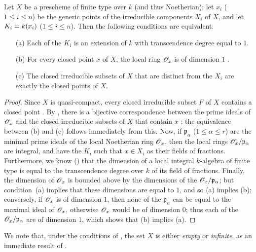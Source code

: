 \begin{proposition}[7.4.1]
\label{II.7.4.1}
Let $X$ be a prescheme of finite type over $k$ (and thus Noetherian);
let $x_i$ ($1\leq i\leq n$) be the generic points of the irreducible components $X_i$ of $X$, and let $K_i=k(x_i)$ ($1\leq i\leq n$).
Then the following conditions are equivalent:
\begin{enumerate}
    \item[\rm{(a)}] Each of the $K_i$ is an extension of $k$ with transcendence degree equal to $1$.
    \item[\rm{(b)}] For every closed point $x$ of $X$, the local ring $\mathscr{O}_x$ is of dimension $1$ .
    \item[\rm{(c)}] The closed irreducible subsets of $X$ that are distinct from the $X_i$ are exactly the closed points of $X$.
\end{enumerate}
\end{proposition}

\begin{proof}
Since $X$ is quasi-compact, every closed irreducible subset $F$ of $X$ contains a closed point .
By , there is a bijective correspondence between the prime ideals of $\mathscr{O}_x$ and the closed irreducible subsets of $X$ that contain $x$ ;
the equivalence between (b) and (c) follows immediately from this.
Now, if $\mathfrak{p}_\alpha$ ($1\leq\alpha\leq r$) are the minimal prime ideals of the local Noetherian ring $\mathscr{O}_x$, then the local rings $\mathscr{O}_x/\mathfrak{p}_\alpha$ are integral, and have the $K_i$ such that $x\in X_i$ as their fields of fractions.
Furthermore, we know (\cite[p.~4-06, th.~2]{I-1}) that the dimension of a local integral $k$-algebra of finite type is equal to the transcendence degree over $k$ of its field of fractions.
Finally, the dimension of $\mathscr{O}_x$ is bounded above by the dimensions of the $\mathscr{O}_x/\mathfrak{p}_\alpha$;
but condition~(a) implies that these dimensions are equal to $1$, and so (a) implies (b);
conversely, if $\mathscr{O}_x$ is of dimension $1$, then none of the $\mathfrak{p}_\alpha$ can be equal to the maximal ideal of $\mathscr{O}_x$, otherwise $\mathscr{O}_x$ would be of dimension $0$;
thus each of the $\mathscr{O}_x/\mathfrak{p}_\alpha$ are of dimension $1$, which shows that (b) implies (a).
\end{proof}

We note that, under the conditions of , the set $X$ is either \emph{empty} or \emph{infinite}, as an immediate result of .

